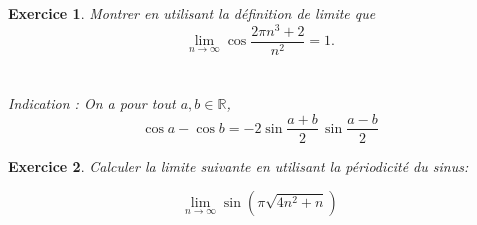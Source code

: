 \documentclass{article}
\newcommand{\R}{\mathbb{R}}
\theoremstyle{exercice}
\newtheorem{exercice}{Exercice}
\begin{document}
\begin{exercice}
Montrer en utilisant la définition de limite que \[\lim_{n\to\infty}\cos{\frac{2\pi n^{3}+2}{n^{2}}} = 1.\] \\ \\
\noindent
\textit{Indication :} On a pour tout $a, b \in \R$, \[\cos a - \cos b = -2\sin{\frac{a+b}{2}}\,\sin{\frac{a-b}{2}}\] 

    
\end{exercice}

\begin{exercice}
    Calculer la limite suivante en utilisant la périodicité du sinus:

    \begin{equation}
        \lim_{n\to \infty} \sin(\pi \sqrt{4 n^2+n}) 
    \end{equation}
       
\end{exercice}
\end{document}
